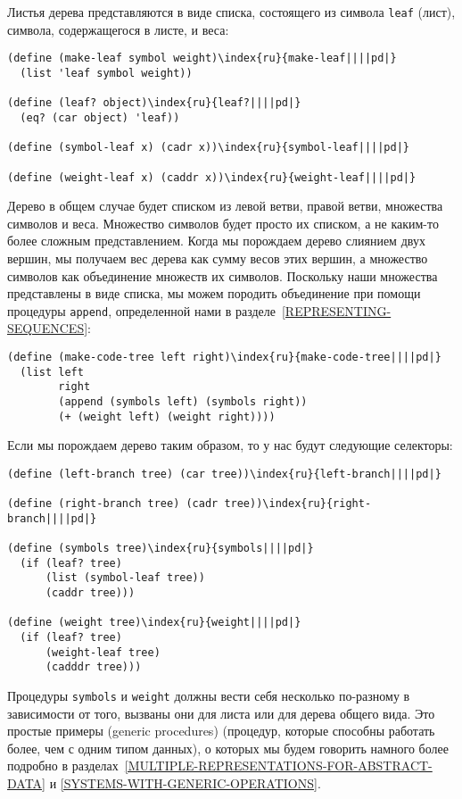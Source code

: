Листья дерева представляются в виде списка, состоящего из 
символа {\tt leaf} (лист), символа, содержащегося в листе, и
веса:

\begin{Verbatim}[fontsize=\small]
(define (make-leaf symbol weight)\index{ru}{make-leaf||||pd|}
  (list 'leaf symbol weight))

(define (leaf? object)\index{ru}{leaf?||||pd|}
  (eq? (car object) 'leaf))

(define (symbol-leaf x) (cadr x))\index{ru}{symbol-leaf||||pd|}

(define (weight-leaf x) (caddr x))\index{ru}{weight-leaf||||pd|}
\end{Verbatim}
Дерево в общем случае будет списком из левой ветви, правой ветви,
множества символов и веса.  Множество символов будет просто их
списком, а не каким-то более сложным представлением.  Когда мы
порождаем дерево слиянием двух вершин, мы получаем вес дерева как
сумму весов этих вершин, а множество символов как объединение множеств 
их символов.  Поскольку наши множества представлены в виде списка, мы
можем породить объединение при помощи процедуры {\tt append},
определенной нами в разделе~\ref{REPRESENTING-SEQUENCES}:

\begin{Verbatim}[fontsize=\small]
(define (make-code-tree left right)\index{ru}{make-code-tree||||pd|}
  (list left
        right
        (append (symbols left) (symbols right))
        (+ (weight left) (weight right))))
\end{Verbatim}
Если мы порождаем дерево таким образом, то у нас будут следующие
селекторы:

\begin{Verbatim}[fontsize=\small]
(define (left-branch tree) (car tree))\index{ru}{left-branch||||pd|}

(define (right-branch tree) (cadr tree))\index{ru}{right-branch||||pd|}

(define (symbols tree)\index{ru}{symbols||||pd|}
  (if (leaf? tree)
      (list (symbol-leaf tree))
      (caddr tree)))

(define (weight tree)\index{ru}{weight||||pd|}
  (if (leaf? tree)
      (weight-leaf tree)
      (cadddr tree)))
\end{Verbatim}
Процедуры {\tt symbols} и {\tt weight} должны вести себя 
несколько по-разному в зависимости от того, вызваны они для листа или
для дерева общего вида.  Это простые примеры  
 (generic procedures) 
(процедур, которые способны работать 
более, чем с одним типом данных), о которых мы будем говорить намного
более подробно в разделах~\ref{MULTIPLE-REPRESENTATIONS-FOR-ABSTRACT-DATA}
и \ref{SYSTEMS-WITH-GENERIC-OPERATIONS}.


